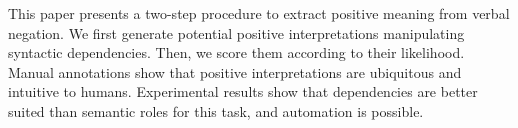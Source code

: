 This paper presents a two-step procedure to extract positive meaning from verbal negation. We first generate potential positive interpretations manipulating syntactic dependencies. Then, we score them according to their likelihood. Manual annotations show that positive interpretations are ubiquitous and intuitive to humans. Experimental results show that dependencies are better suited than semantic roles for this task, and automation is possible.
